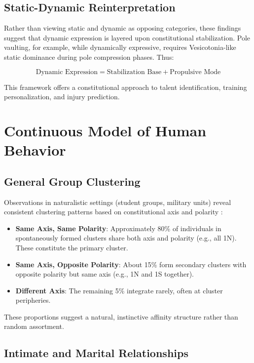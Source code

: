 \documentclass[12pt,a4paper]{article}
\begin{document}
\subsection{Static-Dynamic Reinterpretation}

Rather than viewing static and dynamic as opposing categories, these findings suggest that dynamic expression is layered upon constitutional stabilization. Pole vaulting, for example, while dynamically expressive, requires Vesicotonia-like static dominance during pole compression phases. Thus:

\[
\text{Dynamic Expression} = \text{Stabilization Base} + \text{Propulsive Mode}
\]

This framework offers a constitutional approach to talent identification, training personalization, and injury prediction.

\section{Continuous Model of Human Behavior}

\subsection{General Group Clustering}

Observations in naturalistic settings (student groups, military units) reveal consistent clustering patterns based on constitutional axis and polarity \cite{yoon2026_300}:

\begin{itemize}
    \item \textbf{Same Axis, Same Polarity}: Approximately 80\% of individuals in spontaneously formed clusters share both axis and polarity (e.g., all 1N). These constitute the primary cluster.
    \item \textbf{Same Axis, Opposite Polarity}: About 15\% form secondary clusters with opposite polarity but same axis (e.g., 1N and 1S together).
    \item \textbf{Different Axis}: The remaining 5\% integrate rarely, often at cluster peripheries.
\end{itemize}

These proportions suggest a natural, instinctive affinity structure rather than random assortment.

\subsection{Intimate and Marital Relationships}
\end{document}
